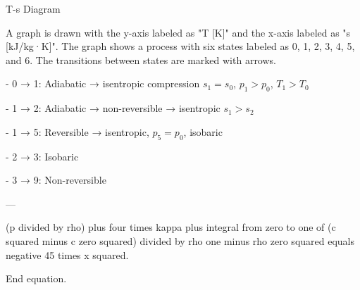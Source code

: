 T-s Diagram  

A graph is drawn with the y-axis labeled as "T [K]" and the x-axis labeled as "s [kJ/kg·K]". The graph shows a process with six states labeled as 0, 1, 2, 3, 4, 5, and 6. The transitions between states are marked with arrows.  

- 0 → 1: Adiabatic → isentropic compression  
  \( s_1 = s_0 \), \( p_1 > p_0 \), \( T_1 > T_0 \)  

- 1 → 2: Adiabatic → non-reversible → isentropic  
  \( s_1 > s_2 \)  

- 1 → 5: Reversible → isentropic, \( p_5 = p_0 \), isobaric  

- 2 → 3: Isobaric  

- 3 → 9: Non-reversible  

---

(p divided by rho) plus four times kappa plus integral from zero to one of (c squared minus c zero squared) divided by rho one minus rho zero squared equals negative 45 times x squared.  

End equation.